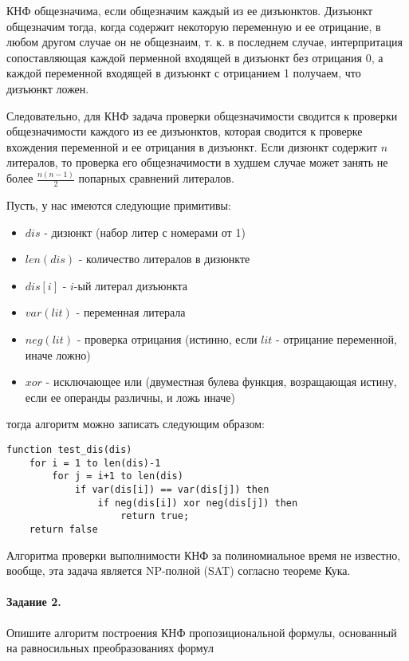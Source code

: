 \documentclass[a4paper,12pt]{article}
\begin{document}
\begin{Solution}
КНФ общезначима, если общезначим каждый из ее дизъюнктов. Дизъюнкт общезначим тогда, когда содержит некоторую переменную и ее отрицание, в любом другом случае он не общезнаим, т. к. в последнем случае, интерпритация сопоставляющая каждой перменной входящей в дизъюнкт без отрицания 0, а каждой переменной входящей в дизъюнкт с отрицанием 1 получаем, что дизъюнкт ложен.

Следовательно, для КНФ задача проверки общезначимости сводится к проверки общезначимости каждого из ее дизъюнктов, которая сводится к проверке вхождения переменной и ее отрицания в дизъюнкт. Если дизюнкт содержит $n$ литералов, то проверка его общезначимости в худшем случае может занять не более $\frac{n\left(n-1\right)}{2}$ попарных сравнений литералов.

Пусть, у нас имеются следующие примитивы:
\begin{itemize}
\item $dis$ - дизюнкт (набор литер с номерами от 1)

\item $len\left(dis\right)$ - количество литералов в дизюнкте

\item $dis\left[i\right]$ - $i$-ый литерал дизъюнкта

\item $var\left(lit\right)$ - переменная литерала

\item $neg\left(lit\right)$ - проверка отрицания (истинно, если $lit$ - отрицание переменной, иначе ложно)

\item $xor$ - исключающее или (двуместная булева функция, возращающая истину, если ее операнды различны, и ложь иначе)
\end{itemize}

тогда алгоритм можно записать следующим образом:
\begin{lstlisting}
function test_dis(dis)
	for i = 1 to len(dis)-1
		for j = i+1 to len(dis)
			if var(dis[i]) == var(dis[j]) then
				if neg(dis[i]) xor neg(dis[j]) then
					return true;
	return false
\end{lstlisting}

Алгоритма проверки выполнимости КНФ за полиномиальное время не известно, вообще, эта задача является NP-полной (SAT) согласно теореме Кука.
\end{Solution}

\paragraph{Задание 2.} Опишите алгоритм построения КНФ пропозициональной формулы, основанный на равносильных преобразованиях формул
\end{document}
